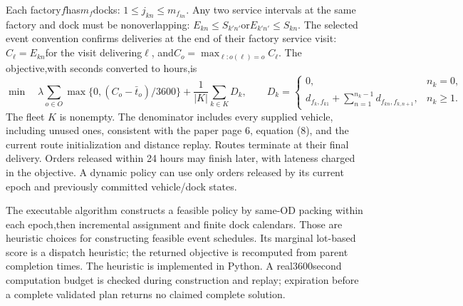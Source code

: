 \documentclass{article}
\begin{document}
Each factory$f$has$m_f$docks:
$1\le j_{kn}\le m_{f_{kn}}$. Any two service intervals at the same
factory and dock must be nonoverlapping:
$E_{kn}\le S_{k'n'}$or$E_{k'n'}\le S_{kn}$.
The selected event convention confirms deliveries at the end of their
factory service visit:
$C_\ell=E_{kn}$for the visit delivering$\ell$,
and$C_o=\max_{\ell:o(\ell)=o}C_\ell$.
The objective,with seconds converted to hours,is
\[
\min\quad\lambda\sum_{o\in O}\max\{0,(C_o-\bar t_o)/3600\}
+\frac1{|K|}\sum_{k\in K}D_k,\qquad
D_k=\begin{cases}0,&n_k=0,\\ d_{f_k,f_{k1}}+\sum_{n=1}^{n_k-1}d_{f_{kn},f_{k,n+1}},&n_k\ge1.\end{cases}
\]
The fleet $K$ is nonempty. The denominator includes every supplied vehicle,
including unused ones, consistent with the paper page 6, equation (8), and
the current route initialization and distance replay.
Routes terminate at their final delivery. Orders released within 24 hours may finish later, with lateness charged in the objective.
A dynamic policy can use only orders released by its current epoch and
previously committed vehicle/dock states.

The executable algorithm constructs a feasible policy by same-OD packing
within each epoch,then incremental assignment and finite dock calendars.
Those are heuristic choices for constructing feasible event schedules. Its marginal lot-based score is a dispatch
heuristic; the returned objective is recomputed from parent completion times.
The heuristic is implemented in Python. A real3600second computation budget
is checked during construction and replay; expiration before a complete
validated plan returns no claimed complete solution.
\end{document}
